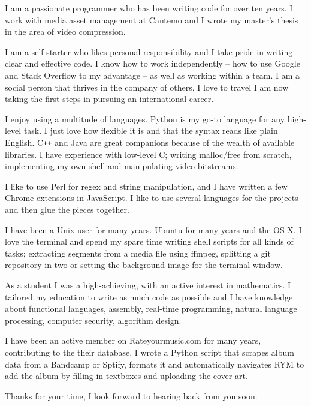 I am a passionate programmer who has been writing code for over ten years. I work with media asset management at Cantemo and I wrote my master's thesis in the area of video compression.

I am a self-starter who likes personal responsibility and I take pride in writing clear and effective code. I know how to work independently -- how to use Google and Stack Overflow to my advantage -- as well as working within a team. I am a social person that thrives in the company of others, I love to travel I am now taking the first steps in pursuing an international career.

I enjoy using a multitude of languages. Python is my go-to language for any high-level task. I just love how flexible it is and that the syntax reads like plain English. C\texttt{++} and Java are great companions because of the wealth of available libraries. I have experience with low-level C; writing malloc/free from scratch, implementing my own shell and manipulating video bitstreams.

I like to use Perl for regex and string manipulation, and I have written a few Chrome extensions in JavaScript. I like to use several languages for the projects and then glue the pieces together.

I have been a Unix user for many years. Ubuntu for many years and the OS X. I love the terminal and spend my spare time writing shell scripts for all kinds of tasks; extracting segments from a media file using ffmpeg, splitting a git repository in two or setting the background image for the terminal window.

As a student I was a high-achieving, with an active interest in mathematics. I tailored my education to write as much code as possible and I have knowledge about functional languages, assembly, real-time programming, natural language processing, computer security, algorithm design.

I have been an active member on Rateyourmusic.com for many years, contributing to the their database. I wrote a Python script that scrapes album data from a Bandcamp or Sptify, formats it and automatically navigates RYM to add the album by filling in textboxes and uploading the cover art.

Thanks for your time, I look forward to hearing back from you soon.
